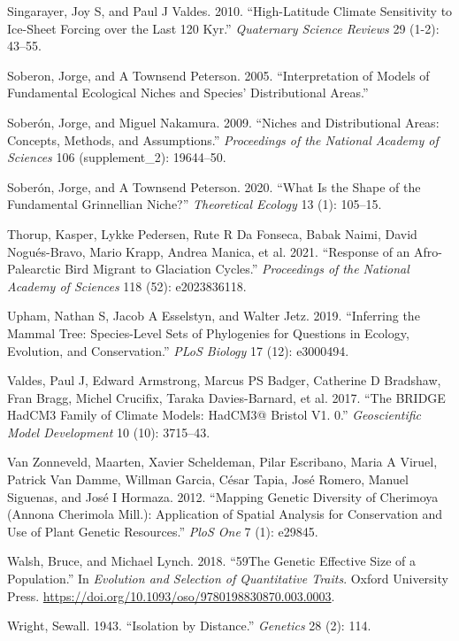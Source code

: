 \documentclass[
]{article}
\newlength{\cslhangindent}
\newlength{\cslentryspacingunit} %
\newenvironment{CSLReferences}[2] %
 {%
  \setlength{\parindent}{0pt}
  \ifodd #1
  \let\oldpar\par
  \def\par{\hangindent=\cslhangindent\oldpar}
  \fi
  \setlength{\parskip}{#2\cslentryspacingunit}
 }%
 {}
\begin{document}
\begin{CSLReferences}{1}{0}
\leavevmode{}%
Singarayer, Joy S, and Paul J Valdes. 2010. {``High-Latitude Climate
Sensitivity to Ice-Sheet Forcing over the Last 120 Kyr.''}
\emph{Quaternary Science Reviews} 29 (1-2): 43--55.

\leavevmode{}%
Soberon, Jorge, and A Townsend Peterson. 2005. {``Interpretation of
Models of Fundamental Ecological Niches and Species' Distributional
Areas.''}

\leavevmode{}%
Soberón, Jorge, and Miguel Nakamura. 2009. {``Niches and Distributional
Areas: Concepts, Methods, and Assumptions.''} \emph{Proceedings of the
National Academy of Sciences} 106 (supplement\_2): 19644--50.

\leavevmode{}%
Soberón, Jorge, and A Townsend Peterson. 2020. {``What Is the Shape of
the Fundamental Grinnellian Niche?''} \emph{Theoretical Ecology} 13 (1):
105--15.

\leavevmode{}%
Thorup, Kasper, Lykke Pedersen, Rute R Da Fonseca, Babak Naimi, David
Nogués-Bravo, Mario Krapp, Andrea Manica, et al. 2021. {``Response of an
Afro-Palearctic Bird Migrant to Glaciation Cycles.''} \emph{Proceedings
of the National Academy of Sciences} 118 (52): e2023836118.

\leavevmode{}%
Upham, Nathan S, Jacob A Esselstyn, and Walter Jetz. 2019. {``Inferring
the Mammal Tree: Species-Level Sets of Phylogenies for Questions in
Ecology, Evolution, and Conservation.''} \emph{PLoS Biology} 17 (12):
e3000494.

\leavevmode{}%
Valdes, Paul J, Edward Armstrong, Marcus PS Badger, Catherine D
Bradshaw, Fran Bragg, Michel Crucifix, Taraka Davies-Barnard, et al.
2017. {``The BRIDGE HadCM3 Family of Climate Models: HadCM3@ Bristol V1.
0.''} \emph{Geoscientific Model Development} 10 (10): 3715--43.

\leavevmode{}%
Van Zonneveld, Maarten, Xavier Scheldeman, Pilar Escribano, Maria A
Viruel, Patrick Van Damme, Willman Garcia, César Tapia, José Romero,
Manuel Siguenas, and José I Hormaza. 2012. {``Mapping Genetic Diversity
of Cherimoya (Annona Cherimola Mill.): Application of Spatial Analysis
for Conservation and Use of Plant Genetic Resources.''} \emph{PloS One}
7 (1): e29845.

\leavevmode{}%
Walsh, Bruce, and Michael Lynch. 2018. {``{59The Genetic Effective Size
of a Population}.''} In \emph{{Evolution and Selection of Quantitative
Traits}}. Oxford University Press.
\url{https://doi.org/10.1093/oso/9780198830870.003.0003}.

\leavevmode{}%
Wright, Sewall. 1943. {``Isolation by Distance.''} \emph{Genetics} 28
(2): 114.

\end{CSLReferences}
\end{document}
